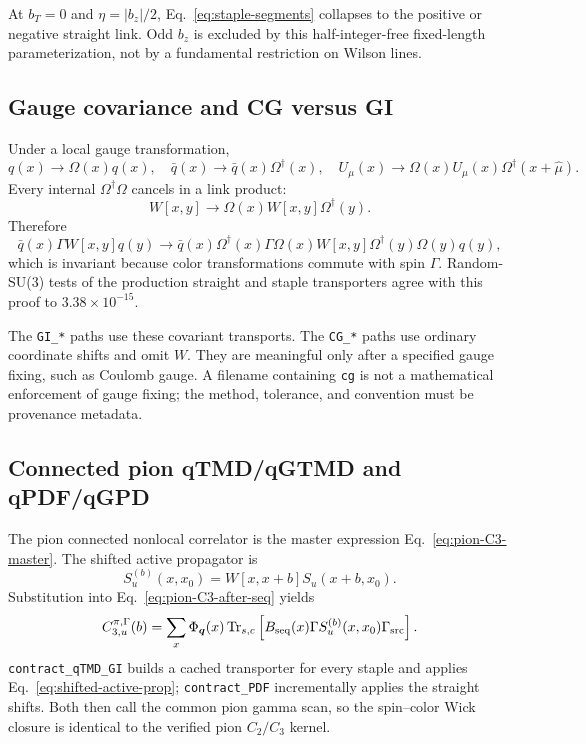 \documentclass[11pt,a4paper]{article}
\numberwithin{equation}{section}
\newcommand{\Trsc}{\operatorname{Tr}_{s,c}}
\newcommand{\abs}[1]{\left|#1\right|}
\newcommand{\Gsrc}{\Gamma_{\mathrm{src}}}
\newcommand{\code}[1]{%
  \ifmmode\text{\texttt{\detokenize{#1}}}\else\nolinkurl{#1}\fi}
\begin{document}
At \(b_T=0\) and \(\eta=\abs{b_z}/2\),
Eq.~\eqref{eq:staple-segments} collapses to the positive or negative straight
link.  Odd \(b_z\) is excluded by this half-integer-free fixed-length
parameterization, not by a fundamental restriction on Wilson lines.

\subsection{Gauge covariance and CG versus GI}

Under a local gauge transformation,
\begin{equation}
 q(x)\to\Omega(x)q(x),\quad
 \bar q(x)\to\bar q(x)\Omega^\dagger(x),\quad
 U_\mu(x)\to\Omega(x)U_\mu(x)\Omega^\dagger(x+\hat\mu).
\end{equation}
Every internal \(\Omega^\dagger\Omega\) cancels in a link product:
\begin{equation}
 W[x,y]\to\Omega(x)W[x,y]\Omega^\dagger(y).
\end{equation}
Therefore
\begin{equation}
 \bar q(x)\Gamma W[x,y]q(y)
\to
\bar q(x)\Omega^\dagger(x)\Gamma\Omega(x)
W[x,y]\Omega^\dagger(y)\Omega(y)q(y),
\end{equation}
which is invariant because color transformations commute with spin
\(\Gamma\).  Random-SU(3) tests of the production straight and staple
transporters agree with this proof to \(3.38\times10^{-15}\).

The \code{GI_*} paths use these covariant transports.  The \code{CG_*} paths
use ordinary coordinate shifts and omit \(W\).  They are meaningful only
after a specified gauge fixing, such as Coulomb gauge.  A filename containing
\code{cg} is not a mathematical enforcement of gauge fixing; the method,
tolerance, and convention must be provenance metadata.

\subsection{Connected pion qTMD/qGTMD and qPDF/qGPD}

The pion connected nonlocal correlator is the master expression
Eq.~\eqref{eq:pion-C3-master}.  The shifted active propagator is
\begin{equation}
 S_u^{(b)}(x,x_0)
 =W[x,x+b]S_u(x+b,x_0).
 \label{eq:shifted-active-prop}
\end{equation}
Substitution into Eq.~\eqref{eq:pion-C3-after-seq} yields
\begin{equation}
 C_{3,u}^{\pi,\Gamma}(b)
 =\sum_x\Phi_{\boldsymbol q}(x)
 \Trsc\left[
 B_{\rm seq}(x)\Gamma S_u^{(b)}(x,x_0)\Gsrc
 \right].
 \label{eq:pion-qtmd-code-form}
\end{equation}
\code{contract_qTMD_GI} builds a cached transporter for every staple and
applies Eq.~\eqref{eq:shifted-active-prop}; \code{contract_PDF} incrementally
applies the straight shifts.  Both then call the common pion gamma scan, so
the spin--color Wick closure is identical to the verified pion \(C_2/C_3\)
kernel.
\end{document}
